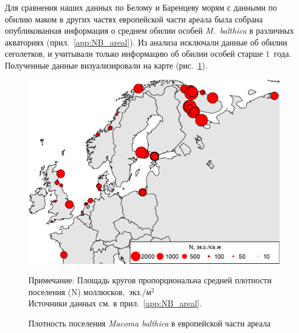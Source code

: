 
Для сравнения наших данных по Белому и Баренцеву морям с данными по обилию маком в других частях европейской части ареала была собрана опубликованная информация о среднем обилии особей {\it M.~balthica} в различных акваториях (прил.~\ref{app:NB_areal}). 
Из анализа исключали данные об обилии сеголетков, и учитывали только информацию об обилии особей старше $1$~года.
Полученные данные визуализировали на карте (рис.~\ref{ris:N_macrodistribution}).
	\begin{figure}[p]
    \includegraphics[width=\textwidth]{../macrodistribution/Nmean_ru1.pdf}
    \caption{Плотность поселения {\it Macoma balthica} в европейской части ареала}

{\footnotesize Примечание: Площадь кругов пропорциональна средней плотности поселения (N) моллюсков,~экз./м$^2$\\
Источники данных см. в прил.~\ref{app:NB_areal}.}
    \label{ris:N_macrodistribution}
	\end{figure}
